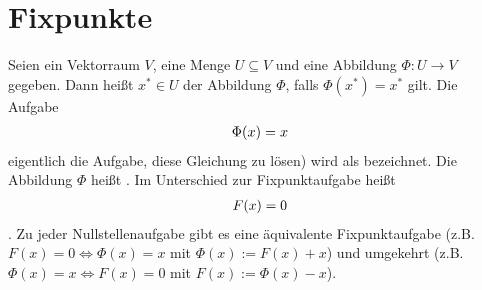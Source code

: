 \section{Fixpunkte}

Seien ein Vektorraum $V$, eine Menge $U \subseteq V$ und eine Abbildung $\Phi: U \to V$ gegeben.
Dann heißt $x^{*} \in U$  der Abbildung $\Phi$, falls $\Phi(x^{*}) = x^{*}$ gilt.
Die Aufgabe
\begin{align}
\Phi(x) = x\notag
\end{align}
eigentlich die Aufgabe, diese Gleichung zu lösen) wird als  bezeichnet.
Die Abbildung $\Phi$ heißt . Im Unterschied zur Fixpunktaufgabe heißt
\begin{align}
F(x) = 0 \notag
\end{align}
. 
Zu jeder Nullstellenaufgabe gibt es eine äquivalente Fixpunktaufgabe (z.B. $F(x) = 0 \Leftrightarrow \Phi(x) = x $ mit $\Phi(x) := F(x) + x$) und umgekehrt (z.B.
$\Phi(x) = x \Leftrightarrow F(x) = 0$ mit $F(x) := \Phi(x) -x$).